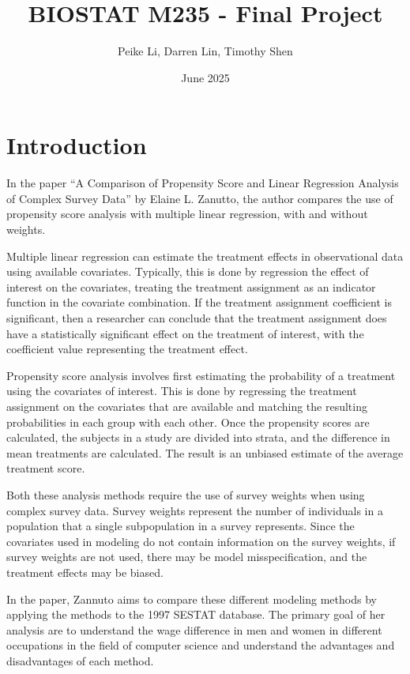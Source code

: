 \documentclass[12pt]{article}
\title{BIOSTAT M235 - Final Project}
\author{Peike Li, Darren Lin, Timothy Shen}
\date{June 2025}
\begin{document}
\doublespacing


\maketitle

\newpage

\section{Introduction}

In the paper “A Comparison of Propensity Score and Linear Regression Analysis of Complex Survey Data” by Elaine L. Zanutto, the author compares the use of propensity score analysis with multiple linear regression, with and without weights.

Multiple linear regression can estimate the treatment effects in observational data using available covariates. Typically, this is done by regression the effect of interest on the covariates, treating the treatment assignment as an indicator function in the covariate combination. If the treatment assignment coefficient is significant, then a researcher can conclude that the treatment assignment does have a statistically significant effect on the treatment of interest, with the coefficient value representing the treatment effect.

Propensity score analysis involves first estimating the probability of a treatment using the covariates of interest. This is done by regressing the treatment assignment on the covariates that are available and matching the resulting probabilities in each group with each other. Once the propensity scores are calculated, the subjects in a study are divided into strata, and the difference in mean treatments are calculated. The result is an unbiased estimate of the average treatment score.

Both these analysis methods require the use of survey weights when using complex survey data. Survey weights represent the number of individuals in a population that a single subpopulation in a survey represents. Since the covariates used in modeling do not contain information on the survey weights, if survey weights are not used, there may be model misspecification, and the treatment effects may be biased.

In the paper, Zannuto aims to compare these different modeling methods by applying the methods to the 1997 SESTAT database. The primary goal of her analysis are to understand the wage difference in men and women in different occupations in the field of computer science and understand the advantages and disadvantages of each method.
\end{document}
